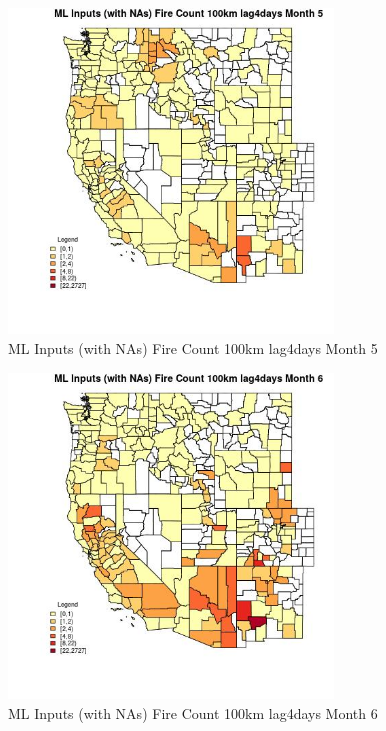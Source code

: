 \clearpage 

\begin{figure} 
\centering  
\includegraphics[width=0.77\textwidth]{Code_Outputs/Report_ML_input_PM25_Step4_part_f_de_duplicated_aves_prioritize_24hr_obswNAs_CountyFire_Count_100km_lag4daysmedianMonth5.jpg} 
\caption{\label{fig:Report_ML_input_PM25_Step4_part_f_de_duplicated_aves_prioritize_24hr_obswNAsCountyFire_Count_100km_lag4daysmedianMonth5}ML Inputs (with NAs) Fire Count 100km lag4days Month 5} 
\end{figure} 
 

\begin{figure} 
\centering  
\includegraphics[width=0.77\textwidth]{Code_Outputs/Report_ML_input_PM25_Step4_part_f_de_duplicated_aves_prioritize_24hr_obswNAs_CountyFire_Count_100km_lag4daysmedianMonth6.jpg} 
\caption{\label{fig:Report_ML_input_PM25_Step4_part_f_de_duplicated_aves_prioritize_24hr_obswNAsCountyFire_Count_100km_lag4daysmedianMonth6}ML Inputs (with NAs) Fire Count 100km lag4days Month 6} 
\end{figure} 
 

